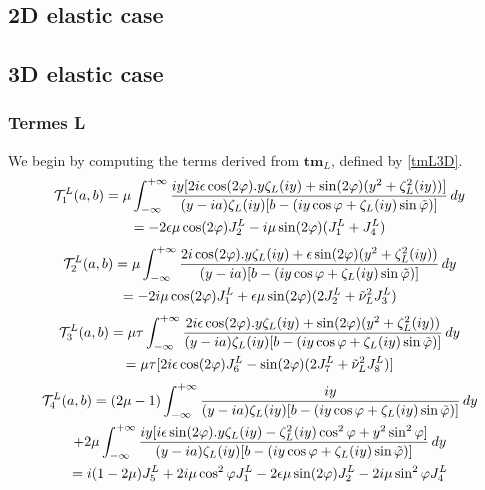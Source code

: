 \subsection{2D elastic case}
\label{finalT2D}
\subsection{3D elastic case}
\label{finalT3D}

\subsubsection{Termes L}
We begin by computing the terms derived from $\mathbf{tm}_L$, defined by \eqref{tmL3D}.
\begin{multline}
\mathcal{T}_1^L(a,b)= \mu \int_{-\infty}^{+\infty} \frac{iy\lbrack 2i\epsilon\cos(2\varphi).y\zeta_L(iy)+\sin(2\varphi)(y^2+\zeta_L^2(iy))\rbrack}{(y-ia)\zeta_L(iy)\lbrack b- (iy\cos \varphi+ \zeta_L(iy)\sin\phiti) \rbrack} \, dy \\
\hfill =-2\epsilon\mu\cos(2\varphi)J_2^L-i\mu\sin(2\varphi)(J_1^L+J_4^L) \hfill
\end{multline}
\begin{multline}
\mathcal{T}_2^L(a,b)=\mu \int_{-\infty}^{+\infty} \frac{2i \cos(2\varphi).y\zeta_L(iy)+\epsilon \sin(2\varphi)(y^2+\zeta_L^2(iy))}{(y-ia)\lbrack b- (iy\cos \varphi+\zeta_L(iy)\sin\phiti )\rbrack} \, dy \\
\hfill =-2i\mu\cos(2\varphi)J_1^L+\epsilon\mu\sin(2\varphi)(2J_2^L+\nuti_L^2J_3^L) \hfill
\end{multline}
\begin{multline}
\mathcal{T}_3^L(a,b)=\mu\tau \int_{-\infty}^{+\infty} \frac{ 2i\epsilon\cos(2\varphi).y\zeta_L(iy)+\sin(2\varphi)(y^2+\zeta_L^2(iy))}{(y-ia)\zeta_L(iy)\lbrack b- (iy\cos \varphi+ \zeta_L(iy)\sin \phiti) \rbrack} \, dy \\
\hfill =\mu\tau \lbrack 2i\epsilon\cos(2\varphi)J_6^L-\sin(2\varphi)(2J_7^L+\nuti_L^2J_8^L) \rbrack \hfill
\end{multline}
\begin{multline}
\mathcal{T}_4^L(a,b)= (2\mu-1) \int_{-\infty}^{+\infty}\frac{iy}{(y-ia)\zeta_L(iy)\lbrack b-(iy\cos \varphi+\zeta_L(iy)\sin\phiti) \rbrack} \, dy \\
+2 \mu\int_{-\infty}^{+\infty} \frac{iy\lbrack i\epsilon\sin(2\varphi).y\zeta_L(iy)-\zeta_L^2(iy)\cos^2\varphi+y^2\sin^2\varphi \rbrack}{(y-ia)\zeta_L(iy)\lbrack b- (iy\cos \varphi+\zeta_L(iy)\sin\phiti) \rbrack} \, dy\\
\hfill=i(1-2\mu)J_5^L+2i\mu\cos^2\varphi J_1^L-2\epsilon\mu\sin(2\varphi)J_2^L-2i\mu\sin^2\varphi J_4^L \hfill
\end{multline}
